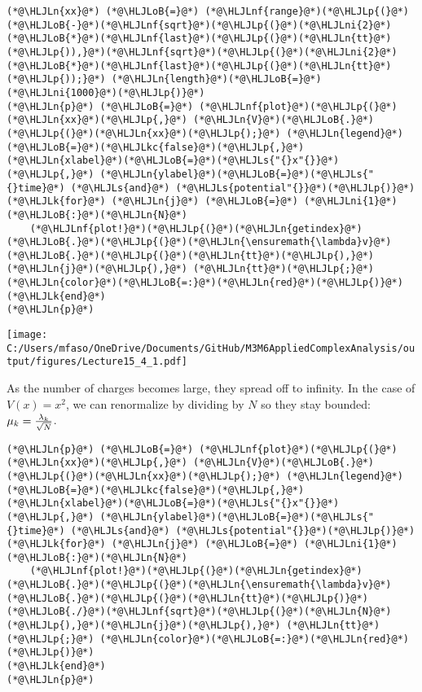 \documentclass[12pt,a4paper]{article}
\newcommand{\HLJLk}[1]{\textcolor[RGB]{148,91,176}{\textbf{#1}}}
\newcommand{\HLJLkc}[1]{\textcolor[RGB]{59,151,46}{\textit{#1}}}
\newcommand{\HLJLn}[1]{#1}
\newcommand{\HLJLnf}[1]{\textcolor[RGB]{66,102,213}{#1}}
\newcommand{\HLJLs}[1]{\textcolor[RGB]{201,61,57}{#1}}
\newcommand{\HLJLni}[1]{\textcolor[RGB]{59,151,46}{#1}}
\newcommand{\HLJLoB}[1]{\textcolor[RGB]{102,102,102}{\textbf{#1}}}
\newcommand{\HLJLp}[1]{#1}
\begin{document}
\begin{lstlisting}
(*@\HLJLn{xx}@*) (*@\HLJLoB{=}@*) (*@\HLJLnf{range}@*)(*@\HLJLp{(}@*)(*@\HLJLoB{-}@*)(*@\HLJLnf{sqrt}@*)(*@\HLJLp{(}@*)(*@\HLJLni{2}@*)(*@\HLJLoB{*}@*)(*@\HLJLnf{last}@*)(*@\HLJLp{(}@*)(*@\HLJLn{tt}@*)(*@\HLJLp{)),}@*)(*@\HLJLnf{sqrt}@*)(*@\HLJLp{(}@*)(*@\HLJLni{2}@*)(*@\HLJLoB{*}@*)(*@\HLJLnf{last}@*)(*@\HLJLp{(}@*)(*@\HLJLn{tt}@*)(*@\HLJLp{));}@*) (*@\HLJLn{length}@*)(*@\HLJLoB{=}@*)(*@\HLJLni{1000}@*)(*@\HLJLp{)}@*)
(*@\HLJLn{p}@*) (*@\HLJLoB{=}@*) (*@\HLJLnf{plot}@*)(*@\HLJLp{(}@*)(*@\HLJLn{xx}@*)(*@\HLJLp{,}@*) (*@\HLJLn{V}@*)(*@\HLJLoB{.}@*)(*@\HLJLp{(}@*)(*@\HLJLn{xx}@*)(*@\HLJLp{);}@*) (*@\HLJLn{legend}@*)(*@\HLJLoB{=}@*)(*@\HLJLkc{false}@*)(*@\HLJLp{,}@*) (*@\HLJLn{xlabel}@*)(*@\HLJLoB{=}@*)(*@\HLJLs{"{}x"{}}@*)(*@\HLJLp{,}@*) (*@\HLJLn{ylabel}@*)(*@\HLJLoB{=}@*)(*@\HLJLs{"{}time}@*) (*@\HLJLs{and}@*) (*@\HLJLs{potential"{}}@*)(*@\HLJLp{)}@*)
(*@\HLJLk{for}@*) (*@\HLJLn{j}@*) (*@\HLJLoB{=}@*) (*@\HLJLni{1}@*)(*@\HLJLoB{:}@*)(*@\HLJLn{N}@*)
    (*@\HLJLnf{plot!}@*)(*@\HLJLp{(}@*)(*@\HLJLn{getindex}@*)(*@\HLJLoB{.}@*)(*@\HLJLp{(}@*)(*@\HLJLn{\ensuremath{\lambda}v}@*)(*@\HLJLoB{.}@*)(*@\HLJLp{(}@*)(*@\HLJLn{tt}@*)(*@\HLJLp{),}@*)(*@\HLJLn{j}@*)(*@\HLJLp{),}@*) (*@\HLJLn{tt}@*)(*@\HLJLp{;}@*) (*@\HLJLn{color}@*)(*@\HLJLoB{=:}@*)(*@\HLJLn{red}@*)(*@\HLJLp{)}@*)
(*@\HLJLk{end}@*)
(*@\HLJLn{p}@*)
\end{lstlisting}

\texttt{[image: C:/Users/mfaso/OneDrive/Documents/GitHub/M3M6AppliedComplexAnalysis/output/figures/Lecture15\_4\_1.pdf]}

As the number of charges becomes large, they spread off to infinity. In the case of $V(x) = x^2$, we can renormalize by  dividing by $N$ so they stay bounded: $\mu_k = {\lambda_k \over \sqrt N}$.


\begin{lstlisting}
(*@\HLJLn{p}@*) (*@\HLJLoB{=}@*) (*@\HLJLnf{plot}@*)(*@\HLJLp{(}@*)(*@\HLJLn{xx}@*)(*@\HLJLp{,}@*) (*@\HLJLn{V}@*)(*@\HLJLoB{.}@*)(*@\HLJLp{(}@*)(*@\HLJLn{xx}@*)(*@\HLJLp{);}@*) (*@\HLJLn{legend}@*)(*@\HLJLoB{=}@*)(*@\HLJLkc{false}@*)(*@\HLJLp{,}@*) (*@\HLJLn{xlabel}@*)(*@\HLJLoB{=}@*)(*@\HLJLs{"{}x"{}}@*)(*@\HLJLp{,}@*) (*@\HLJLn{ylabel}@*)(*@\HLJLoB{=}@*)(*@\HLJLs{"{}time}@*) (*@\HLJLs{and}@*) (*@\HLJLs{potential"{}}@*)(*@\HLJLp{)}@*)
(*@\HLJLk{for}@*) (*@\HLJLn{j}@*) (*@\HLJLoB{=}@*) (*@\HLJLni{1}@*)(*@\HLJLoB{:}@*)(*@\HLJLn{N}@*)
    (*@\HLJLnf{plot!}@*)(*@\HLJLp{(}@*)(*@\HLJLn{getindex}@*)(*@\HLJLoB{.}@*)(*@\HLJLp{(}@*)(*@\HLJLn{\ensuremath{\lambda}v}@*)(*@\HLJLoB{.}@*)(*@\HLJLp{(}@*)(*@\HLJLn{tt}@*)(*@\HLJLp{)}@*)(*@\HLJLoB{./}@*)(*@\HLJLnf{sqrt}@*)(*@\HLJLp{(}@*)(*@\HLJLn{N}@*)(*@\HLJLp{),}@*)(*@\HLJLn{j}@*)(*@\HLJLp{),}@*) (*@\HLJLn{tt}@*)(*@\HLJLp{;}@*) (*@\HLJLn{color}@*)(*@\HLJLoB{=:}@*)(*@\HLJLn{red}@*)(*@\HLJLp{)}@*)
(*@\HLJLk{end}@*)
(*@\HLJLn{p}@*)
\end{lstlisting}
\end{document}
